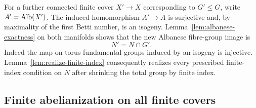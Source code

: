For a further connected finite cover \(X'\to X\) corresponding to
\(G'\le G\), write \(A'=\operatorname{Alb}(X')\). The induced homomorphism
\(A'\to A\) is surjective and, by maximality of the first Betti
number, is an isogeny. Lemma~\ref{lem:albanese-exactness} on both
manifolds shows that the new Albanese fibre-group image is
\begin{equation}\label{eq:fibre-intersection}
 N'=N\cap G'.
\end{equation}
Indeed the map on torus fundamental groups induced by an isogeny
is injective. Lemma~\ref{lem:realize-finite-index} consequently
realizes every prescribed finite-index condition on \(N\) after
shrinking the total group by finite index.

\subsection{Finite abelianization on all finite covers}

